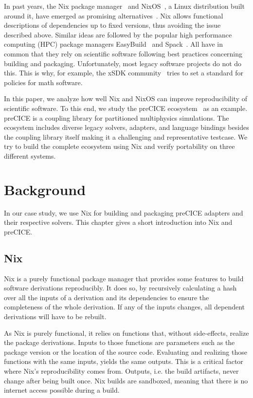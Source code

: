 \documentclass{eceasst}
\begin{document}
In past years, the Nix package manager~\cite{Dolstra_2004} and NixOS~\cite{Dolstra_2010}, a Linux distribution built around it, have emerged as promising alternatives~\cite{Devresse_2015}.
Nix allows functional descriptions of dependencies up to fixed versions, thus avoiding the issue described above.
Similar ideas are followed by the popular high performance computing (HPC) package managers EasyBuild~\cite{easybuil6495863} and Spack~\cite{spack7832814}.
All have in common that they rely on scientific software following best practices concerning building and packaging.
Unfortunately, most legacy software projects do not do this.
This is why, for example, the xSDK community~\cite{xSDK2023} tries to set a standard for policies for math software.

In this paper, we analyze how well Nix and NixOS can improve reproducibility of scientific software.
To this end, we study the preCICE ecosystem~\cite{preCICEv2} as an example.
preCICE is a coupling library for partitioned multiphysics simulations.
The ecosystem includes diverse legacy solvers, adapters, and language bindings besides the coupling library itself making it a challenging and representative testcase.
We try to build the complete ecosystem using Nix and verify portability on three different systems.

\section{Background}

In our case study, we use Nix for building and packaging preCICE adapters and their respective solvers.
This chapter gives a short introduction into Nix and preCICE.

\subsection{Nix}\label{sec:nix}

Nix is a purely functional package manager that provides some features to build software derivations reproducibly.
It does so, by recursively calculating a hash over all the inputs of a derivation and its dependencies to ensure the completeness of the whole derivation.
If any of the inputs changes, all dependent derivations will have to be rebuilt.

As Nix is purely functional, it relies on functions that, without side-effects, realize the package derivations.
Inputs to those functions are parameters such as the package version or the location of the source code.
Evaluating and realizing those functions with the same inputs, yields the same outputs.
This is a critical factor where Nix's reproducibility comes from.
Outputs, i.e. the build artifacts, never change after being built once.
Nix builds are sandboxed, meaning that there is no internet access possible during a build.
\end{document}
